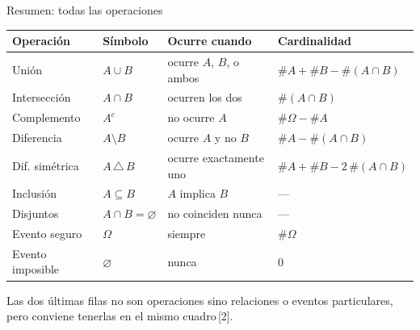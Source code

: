 \documentclass[aspectratio=169,10pt]{beamer}
\begin{document}
\begin{frame}{Resumen: todas las operaciones}
  \footnotesize
  \begin{center}
  \begin{tabular}{@{}llll@{}}
    \toprule
    \textbf{Operación} & \textbf{Símbolo} & \textbf{Ocurre cuando} &
    \textbf{Cardinalidad} \\
    \midrule
    Unión            & $A\cup B$            & ocurre $A$, $B$, o ambos
                     & $\#A+\#B-\#(A\cap B)$ \\
    Intersección     & $A\cap B$            & ocurren los dos
                     & $\#(A\cap B)$ \\
    Complemento      & $A^{c}$              & no ocurre $A$
                     & $\#\Omega-\#A$ \\
    Diferencia       & $A\setminus B$       & ocurre $A$ y no $B$
                     & $\#A-\#(A\cap B)$ \\
    Dif. simétrica   & $A\,\triangle\,B$    & ocurre exactamente uno
                     & $\#A+\#B-2\,\#(A\cap B)$ \\
    \midrule
    Inclusión        & $A\subseteq B$       & $A$ implica $B$ & --- \\
    Disjuntos        & $A\cap B=\varnothing$& no coinciden nunca & --- \\
    Evento seguro    & $\Omega$             & siempre & $\#\Omega$ \\
    Evento imposible & $\varnothing$        & nunca & $0$ \\
    \bottomrule
  \end{tabular}
  \end{center}

  \vspace{0.2cm}
  {\scriptsize\color{uniGris} Las dos últimas filas no son operaciones sino
  relaciones o eventos particulares, pero conviene tenerlas en el mismo
  cuadro\,[2].}
\end{frame}
\end{document}
